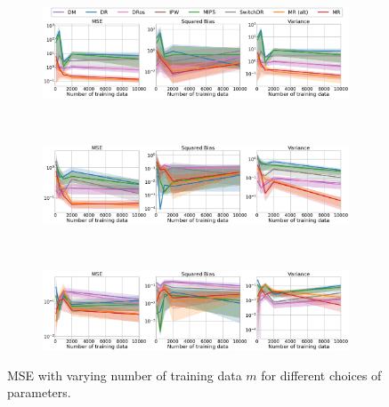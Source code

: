 \begin{figure}[ht]
    \centering
	\begin{subfigure}{0.8\textwidth}
	    \centering
	    \includegraphics[width=1\textwidth]{figures/mr/mips_experiments/ope_vs_ntrain_dimc_1000_alphatar_0_8_nac_10_nev_10.png}
	    \label{subfig:d-1000-neval-10-alphatar-0-8-ntr-mips}
	\end{subfigure}\\
	\begin{subfigure}{0.8\textwidth} 
	    \centering
	    \includegraphics[width=1\textwidth]{figures/mr/mips_experiments/ope_vs_ntrain_dimc_1000_alphatar_0_8_nac_10_nev_200.png}
	    \label{subfig:d-1000-neval-200-alphatar-0-8-ntr-mips}
	\end{subfigure}\\
	\begin{subfigure}{0.8\textwidth} 
	    \centering
	    \includegraphics[width=1\textwidth]{figures/mr/mips_experiments/ope_vs_ntrain_dimc_1000_alphatar_0_8_nac_10_nev_800.png}
	    \label{subfig:d-1000-neval-800-alphatar-0-8-ntr-mips}
	\end{subfigure}
    \caption{MSE with varying number of training data $m$ for different choices of parameters.}
    \label{fig:mse-vs-ntr-mips}
\end{figure}

